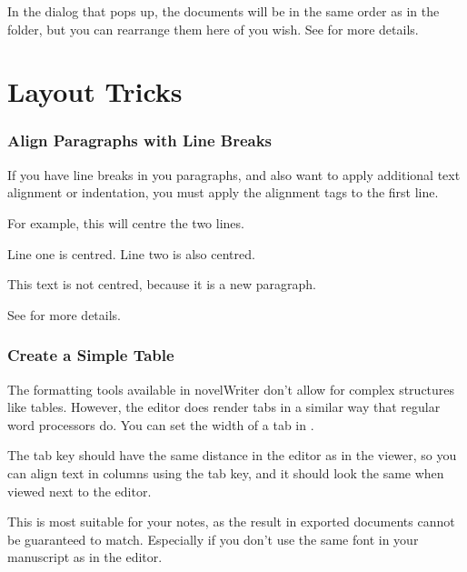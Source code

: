 \documentclass[a4paper,11pt,english]{sphinxmanual}
\begin{document}
\sphinxAtStartPar
In the dialog that pops up, the documents will be in the same order as in the folder, but you
can rearrange them here of you wish. See {\hyperref[\detokenize{usage_project:a-ui-tree-split-merge}]{}} for more details.


\section{Layout Tricks}
\label{\detokenize{int_howto:layout-tricks}}\subsubsection*{Align Paragraphs with Line Breaks}

\sphinxAtStartPar
If you have line breaks in you paragraphs, and also want to apply additional text alignment or
indentation, you must apply the alignment tags to the first line.

\sphinxAtStartPar
For example, this will centre the two lines.

\begin{sphinxVerbatim}[commandchars=\\\{\}]
\PYGZgt{}\PYGZgt{} Line one is centred. \PYGZlt{}\PYGZlt{}
Line two is also centred.

This text is not centred, because it is a new paragraph.
\end{sphinxVerbatim}

\sphinxAtStartPar
See {\hyperref[\detokenize{usage_format:a-fmt-align}]{}} for more details.
\subsubsection*{Create a Simple Table}

\sphinxAtStartPar
The formatting tools available in novelWriter don’t allow for complex structures like tables.
However, the editor does render tabs in a similar way that regular word processors do. You can
set the width of a tab in .

\sphinxAtStartPar
The tab key should have the same distance in the editor as in the viewer, so you can align text
in columns using the tab key, and it should look the same when viewed next to the editor.

\sphinxAtStartPar
This is most suitable for your notes, as the result in exported documents cannot be guaranteed
to match. Especially if you don’t use the same font in your manuscript as in the editor.
\end{document}

